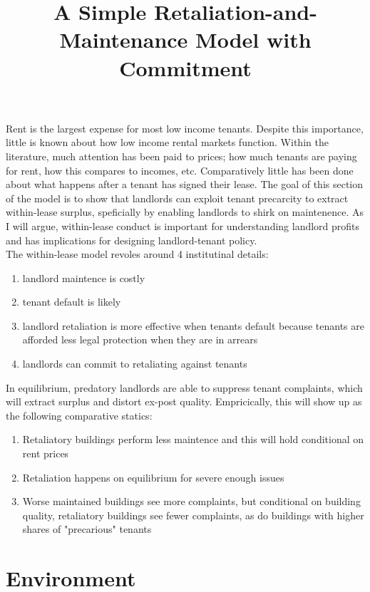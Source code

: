 \documentclass[11pt]{article}
\title{A Simple Retaliation-and-Maintenance Model with Commitment}
\author{}
\date{}
\begin{document}
\maketitle


Rent is the largest expense for most low income tenants. Despite this importance, little is known about how low income rental markets function. Within the literature, much attention has been paid to prices; how much tenants are paying for rent, how this compares to incomes, etc. Comparatively little has been done about what happens after a tenant has signed their lease. The goal of this section of the model is to show that landlords can exploit tenant precarcity to extract within-lease surplus, speficially by enabling landlords to shirk on maintenence. As I will argue, within-lease conduct is important for understanding landlord profits and has implications for designing landlord-tenant policy. \\

The within-lease model revoles around 4 institutinal details:

\begin{enumerate}
  \item landlord maintence is costly
  \item tenant default is likely
  \item landlord retaliation is more effective when tenants default because tenants are afforded less legal protection when they are in arrears
  \item landlords can commit to retaliating against tenants
\end{enumerate}

In equilibrium, predatory landlords are able to suppress tenant complaints, which will extract surplus and distort ex-post quality. Empricically, this will show up as the following comparative statics:

\begin{enumerate}
  \item Retaliatory buildings perform less maintence and this will hold conditional on rent prices 
  \item Retaliation happens on equilibrium for severe enough issues
  \item Worse maintained buildings see more complaints, but conditional on building quality, retaliatory buildings see fewer complaints, as do buildings with higher shares of "precarious" tenants
\end{enumerate}

\section{Environment}
\end{document}
